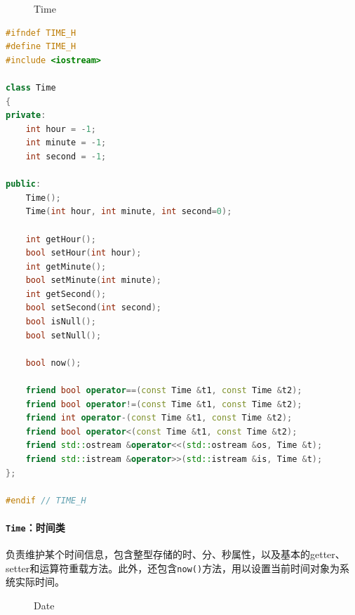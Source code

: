 \documentclass{article}
\begin{document}
				\begin{figure}[H]
					\centering
					
					\caption{Time}
					\label{Time}
				\end{figure}
				
				\begin{lstlisting}[language=C++, caption={Time}]
#ifndef TIME_H
#define TIME_H
#include <iostream>

class Time
{
private:
    int hour = -1;
    int minute = -1;
    int second = -1;

public:
    Time();
    Time(int hour, int minute, int second=0);

    int getHour();
    bool setHour(int hour);
    int getMinute();
    bool setMinute(int minute);
    int getSecond();
    bool setSecond(int second);
    bool isNull();
    bool setNull();

    bool now();
    
    friend bool operator==(const Time &t1, const Time &t2);
    friend bool operator!=(const Time &t1, const Time &t2);
    friend int operator-(const Time &t1, const Time &t2);
    friend bool operator<(const Time &t1, const Time &t2);
    friend std::ostream &operator<<(std::ostream &os, Time &t);
    friend std::istream &operator>>(std::istream &is, Time &t);
};

#endif // TIME_H\end{lstlisting}
				
				\paragraph{\texttt{Time}：时间类} 负责维护某个时间信息，包含整型存储的时、分、秒属性，以及基本的getter、setter和运算符重载方法。此外，还包含\texttt{now()}方法，用以设置当前时间对象为系统实际时间。
				
				
				\begin{figure}[H]
					\centering
					
					\caption{Date}
					\label{Date}
				\end{figure}
				
\end{document}
